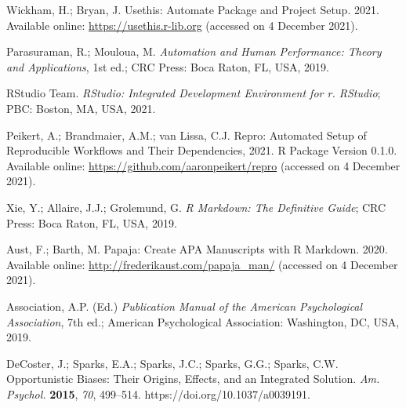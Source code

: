 \documentclass[psych,tutorial,accept,moreauthors,pdftex]{Definitions/mdpi}
\begin{document}
\begin{thebibliography}{999}
Wickham, H.; Bryan, J. Usethis: Automate Package and Project Setup. {2021.} Available online: \url{https://usethis.r-lib.org} (accessed on 4 December 2021).%


Parasuraman, R.; Mouloua, M. \emph{Automation and Human Performance: Theory and Applications}, 1st ed.; CRC Press: Boca Raton, FL, USA, 2019.


RStudio Team. \emph{RStudio: Integrated Development Environment for r. RStudio}; PBC: Boston, MA, USA, 2021.


Peikert, A.; Brandmaier, A.M.; van Lissa, C.J. Repro: Automated Setup of Reproducible Workflows and Their Dependencies, 2021. {R Package Version 0.1.0.} Available online: \url{https://github.com/aaronpeikert/repro} (accessed on 4 December 2021).%


Xie, Y.; Allaire, J.J.; Grolemund, G. \emph{R Markdown: The Definitive Guide}; CRC Press: Boca Raton, FL, USA, 2019.


Aust, F.; Barth, M. Papaja: Create APA Manuscripts with R Markdown. {2020.}  Available online: \url{http://frederikaust.com/papaja_man/} (accessed on 4 December 2021).%


Association, A.P. (Ed.) \emph{Publication Manual of the American Psychological Association}, 7th ed.; American Psychological Association: Washington, DC, USA, 2019.

DeCoster, J.; Sparks, E.A.; Sparks, J.C.; Sparks, G.G.; Sparks, C.W. Opportunistic Biases: Their Origins, Effects, and an Integrated Solution. \emph{Am. Psychol.} \textbf{2015}, \emph{70}, 499–514. https://doi.org/10.1037/a0039191.


\end{thebibliography}
\end{document}
